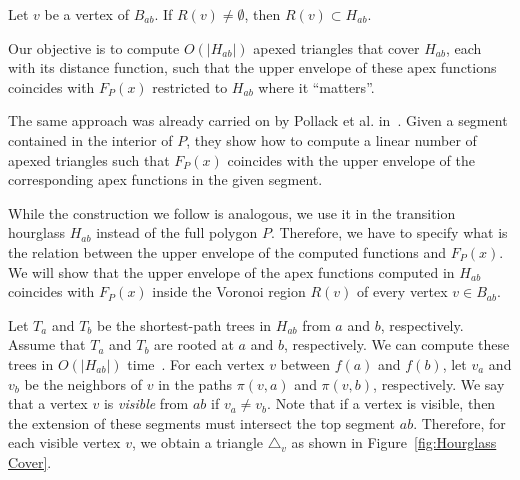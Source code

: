 \documentclass[a4paper,UKenglish]{lipics}
\newcommand{\F}[2]{\ensuremath{F_{\scriptscriptstyle #1}(#2)}}
\newcommand{\fn}[2]{\ensuremath{S_{\scriptscriptstyle #1}(#2)}}
\newcommand{\ff}[1]{\ensuremath{f(#1)}}
\newcommand{\p}[2]{\ensuremath{\pi(#1, #2)}}
\begin{document}
\begin{corollary}\label{lemma:Cell contained in geodesic triangle}
Let $v$ be a vertex of $B_{ab}$. If $R(v)\neq \emptyset$, then $R(v) \subset H_{ab}$.
\end{corollary}


Our objective is to compute $O(|H_{ab}|)$ apexed triangles that cover $H_{ab}$, each with its distance function, such that the upper envelope of these apex functions coincides with $\F{P}{x}$ restricted to $H_{ab}$ where it ``matters''.

The same approach was already carried on by Pollack et al. in~\cite[Section 3]{pollackComputingCenter}. 
Given a segment contained in the interior of $P$, they show 
how to compute a linear number of apexed triangles such that $\F{P}{x}$ coincides with the upper envelope of the corresponding apex functions in the given segment.

While the construction we follow is analogous, we use it in the transition hourglass $H_{ab}$ instead of the full polygon $P$. 
Therefore, we have to specify what is the relation between the upper envelope of the computed functions and $\F{P}{x}$. 
We will show that the upper envelope of the apex functions computed in $H_{ab}$ coincides with $\F{P}{x}$ inside the Voronoi region $R(v)$ of every vertex $v\in B_{ab}$.

Let $T_a$ and $T_b$ be the shortest-path trees in $H_{ab}$ from $a$ and $b$, respectively. Assume that $T_a$ and $T_b$ are rooted at $a$ and $b$, respectively.
We can compute these trees in $O(|H_{ab}|)$ time~\cite{guibasShortestPathTree}. 
For each vertex $v$ between $\ff{a}$ and $\ff{b}$, let $v_a$ and $v_b$ be the neighbors of $v$ in the paths $\p{v}{a}$ and $\p{v}{ b}$, respectively.
We say that a vertex $v$ is \emph{visible} from $ab$ if $v_a\neq v_b$.
Note that if a vertex is visible, then the extension of these segments must intersect the top segment $ab$. 
Therefore, for each visible vertex $v$, we obtain a triangle $\triangle_v$ as shown in Figure~\ref{fig:Hourglass Cover}.
\end{document}
